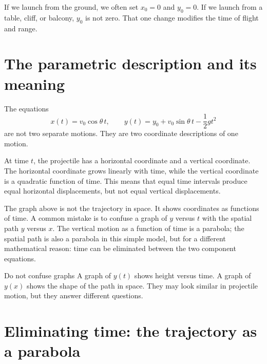 \documentclass[11pt,a4paper]{article}
\begin{document}
If we launch from the ground, we often set $x_0=0$ and $y_0=0$. If we launch from a table, cliff, or balcony, $y_0$ is not zero. That one change modifies the time of flight and range.

\section{The parametric description and its meaning}

The equations
\[
x(t)=v_0\cos\theta\,t,
\qquad
 y(t)=y_0+v_0\sin\theta\,t-\frac12gt^2
\]
are not two separate motions. They are two coordinate descriptions of one motion.

At time $t$, the projectile has a horizontal coordinate and a vertical coordinate. The horizontal coordinate grows linearly with time, while the vertical coordinate is a quadratic function of time. This means that equal time intervals produce equal horizontal displacements, but not equal vertical displacements.

\begin{center}
\end{center}

The graph above is not the trajectory in space. It shows coordinates as functions of time. A common mistake is to confuse a graph of $y$ versus $t$ with the spatial path $y$ versus $x$. The vertical motion as a function of time is a parabola; the spatial path is also a parabola in this simple model, but for a different mathematical reason: time can be eliminated between the two component equations.

\begin{warningbox}{Do not confuse graphs}
A graph of $y(t)$ shows height versus time. A graph of $y(x)$ shows the shape of the path in space. They may look similar in projectile motion, but they answer different questions.
\end{warningbox}

\section{Eliminating time: the trajectory as a parabola}
\end{document}
